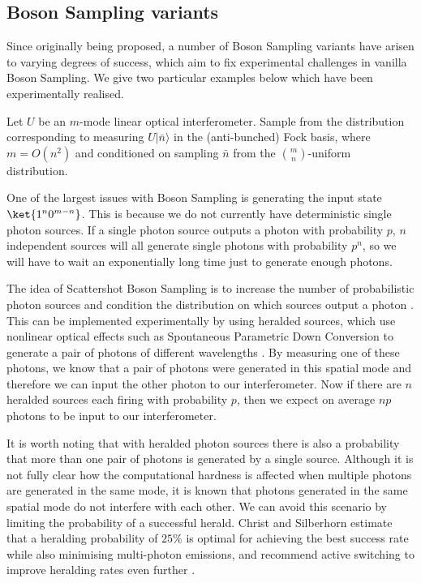 \subsection{Boson Sampling variants}
\label{ssec:bs-variants}

Since originally being proposed, a number of Boson Sampling variants have arisen to varying degrees of success, which aim to fix experimental challenges in vanilla Boson Sampling. We give two particular examples below which have been experimentally realised.

\begin{problem} Let $U$ be an $m$-mode linear optical interferometer. Sample from the distribution corresponding to measuring $U|\bar{n}\rangle$ in the (anti-bunched) Fock basis, where $m=O(n^2)$ and conditioned on sampling $\bar{n}$ from the $\binom{m}{n}$-uniform distribution.
\end{problem}

One of the largest issues with Boson Sampling is generating the input state $\ket{1^n0^{m-n}}$. This is because we do not currently have deterministic single photon sources. If a single photon source outputs a photon with probability $p$, $n$ independent sources will all generate single photons with probability $p^n$, so we will have to wait an exponentially long time just to generate enough photons.

The idea of Scattershot Boson Sampling is to increase the number of probabilistic photon sources and condition the distribution on which sources output a photon \cite{aaronson2013, lund2014}. This can be implemented experimentally by using heralded sources, which use nonlinear optical effects such as Spontaneous Parametric Down Conversion to generate a pair of photons of different wavelengths \cite{loudon2006}. By measuring one of these photons, we know that a pair of photons were generated in this spatial mode and therefore we can input the other photon to our interferometer. Now if there are $n$ heralded sources each firing with probability $p$, then we expect on average $np$ photons to be input to our interferometer.

It is worth noting that with heralded photon sources there is also a probability that more than one pair of photons is generated by a single source. Although it is not fully clear how the computational hardness is affected when multiple photons are generated in the same mode, it is known that photons generated in the same spatial mode do not interfere with each other. We can avoid this scenario by limiting the probability of a successful herald. Christ and Silberhorn estimate that a heralding probability of $25\%$ is optimal for achieving the best success rate while also minimising multi-photon emissions, and recommend active switching to improve heralding rates even further \cite{christ2012}.

